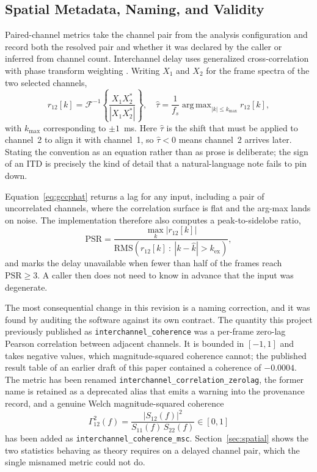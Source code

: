 \documentclass[final]{jaes}
\DeclareMathOperator*{\argmax}{arg\,max}
\begin{document}
\subsection{Spatial Metadata, Naming, and Validity}
\label{sec:spatial-design}

Paired-channel metrics take the channel pair from the analysis configuration and record both the resolved pair and whether it was declared by the caller or inferred from channel count. Interchannel delay uses generalized cross-correlation with phase transform weighting \cite{knapp1976}. Writing $X_1$ and $X_2$ for the frame spectra of the two selected channels,
\begin{equation}
r_{12}[k]=\mathcal{F}^{-1}\!\left\{\frac{X_1 X_2^{*}}{|X_1 X_2^{*}|}\right\}\!,\quad
\hat{\tau}=\frac{1}{f_s}\argmax_{|k|\le k_{\max}} r_{12}[k],
\label{eq:gccphat}
\end{equation}
with $k_{\max}$ corresponding to $\pm 1$~ms. Here $\hat{\tau}$ is the shift that must be applied to channel~2 to align it with channel~1, so $\hat{\tau}<0$ means channel~2 arrives later. Stating the convention as an equation rather than as prose is deliberate; the sign of an ITD is precisely the kind of detail that a natural-language note fails to pin down.

Equation~\eqref{eq:gccphat} returns a lag for any input, including a pair of uncorrelated channels, where the correlation surface is flat and the arg-max lands on noise. The implementation therefore also computes a peak-to-sidelobe ratio,
\begin{equation}
\mathrm{PSR}=\frac{\max_k |r_{12}[k]|}{\mathrm{RMS}\left(r_{12}[k]\ :\ |k-\hat{k}|>k_{\mathrm{ex}}\right)},
\label{eq:psr}
\end{equation}
and marks the delay unavailable when fewer than half of the frames reach $\mathrm{PSR}\ge 3$. A caller then does not need to know in advance that the input was degenerate.

The most consequential change in this revision is a naming correction, and it was found by auditing the software against its own contract. The quantity this project previously published as \texttt{interchannel\_coherence} was a per-frame zero-lag Pearson correlation between adjacent channels. It is bounded in $[-1,1]$ and takes negative values, which magnitude-squared coherence cannot; the published result table of an earlier draft of this paper contained a coherence of $-0.0004$. The metric has been renamed \texttt{interchannel\_correlation\_zerolag}, the former name is retained as a deprecated alias that emits a warning into the provenance record, and a genuine Welch \cite{welch1967} magnitude-squared coherence
\begin{equation}
\Gamma^2_{12}(f)=\frac{|S_{12}(f)|^2}{S_{11}(f)\,S_{22}(f)} \in [0,1]
\label{eq:msc}
\end{equation}
has been added as \texttt{interchannel\_coherence\_msc}. Section~\ref{sec:spatial} shows the two statistics behaving as theory requires on a delayed channel pair, which the single misnamed metric could not do.
\end{document}
